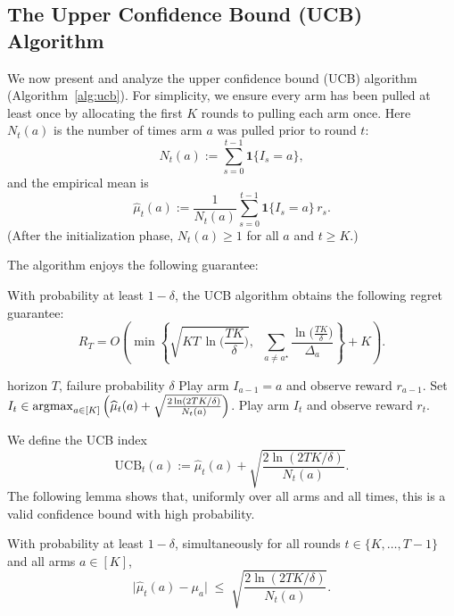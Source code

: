\subsection{The Upper Confidence Bound (UCB) Algorithm}

We now present and analyze the upper confidence bound (UCB) algorithm (Algorithm~\ref{alg:ucb}).
For simplicity, we ensure every arm has been pulled at
least once by allocating the first $K$ rounds to pulling each arm once.
Here $N_t(a)$ is the number of times arm $a$ was pulled prior to round $t$:
\[
N_t(a) := \sum_{s=0}^{t-1}\mathbf{1}\{I_s=a\},
\]
and the empirical mean is
\[
\widehat\mu_t(a) := \frac{1}{N_t(a)}\sum_{s=0}^{t-1}\mathbf{1}\{I_s=a\}\,r_s.
\]
(After the initialization phase, $N_t(a)\ge 1$ for all $a$ and $t\ge K$.)

The algorithm enjoys the following guarantee:

\begin{theorem}\label{thm:mab_main}
With probability at least $1-\delta$, the UCB algorithm obtains the
following regret guarantee:
\[
R_T
= O\!\left(
\min\left\{
\sqrt{KT\,\ln\!\Big(\frac{TK}{\delta}\Big)},
\;\;
\sum_{a\neq a^\star}\frac{\ln\!\big(\frac{TK}{\delta}\big)}{\Delta_a}
\right\}
+ K
\right).
\]
\end{theorem}


\begin{algorithm}[t]
\begin{algorithmic}[1]
\Require horizon $T$, failure probability $\delta$
    \State Play arm $I_{a-1}=a$ and observe reward $r_{a-1}$.
\EndFor
{}
    \State Set $I_t \in \operatorname*{argmax}_{a\in[K]}\left(\widehat\mu_t(a) + \sqrt{\frac{2\ln(2TK/\delta)}{N_t(a)}}\right)$.
    \State Play arm $I_t$ and observe reward $r_t$.
\EndFor
\end{algorithmic}
\caption{UCB}
\label{alg:ucb}
\end{algorithm}


We define the UCB index
\[
\mathrm{UCB}_t(a)
:= \widehat\mu_t(a) + \sqrt{\frac{2\ln(2TK/\delta)}{N_t(a)}}.
\]
The following lemma shows that, uniformly over all arms and all times, this is a
valid confidence bound with high probability.

\begin{lemma}\label{lem:mab_ucb_event}
With probability at least $1-\delta$, simultaneously for all rounds $t\in\{K,\dots,T-1\}$
and all arms $a\in[K]$,
\[
\big|\widehat\mu_t(a)-\mu_a\big|
\;\le\;
\sqrt{\frac{2\ln(2TK/\delta)}{N_t(a)}}.
\]
\end{lemma}


